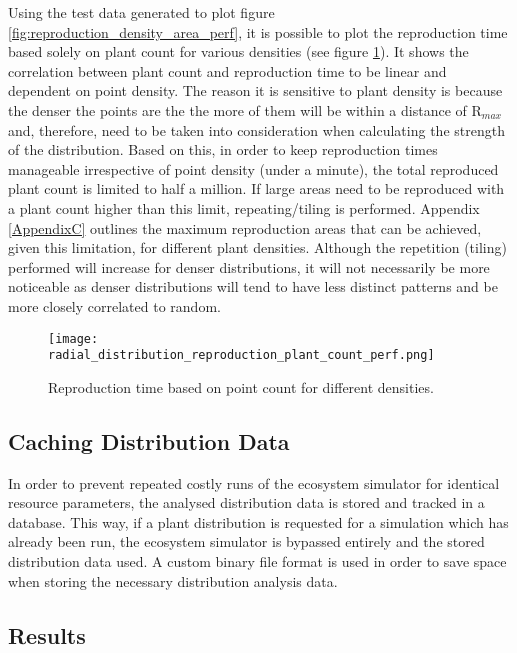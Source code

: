 Using the test data generated to plot figure \ref{fig:reproduction_density_area_perf}, it is possible to plot the reproduction time based solely on plant count for various densities (see figure \ref{fig:reproduction_plant_count_perf}). It shows the correlation between plant count and reproduction time to be linear and dependent on point density. The reason it is sensitive to plant density is because the denser the points are the the more of them will be within a distance of R$_{max}$ and, therefore, need to be taken into consideration when calculating the strength of the distribution. Based on this, in order to keep reproduction times manageable irrespective of point density (under a minute), the total reproduced plant count is limited to half a million. If large areas need to be reproduced with a plant count higher than this limit, repeating/tiling is performed. Appendix \ref{AppendixC} outlines the maximum reproduction areas that can be achieved, given this limitation, for different plant densities. Although the repetition (tiling) performed will increase for denser distributions, it will not necessarily be more noticeable as denser distributions will tend to have less distinct patterns and be more closely correlated to random.\\

\begin{figure}
\center
	\texttt{[image: radial\_distribution\_reproduction\_plant\_count\_perf.png]}
	\caption{ Reproduction time based on point count for different densities.}	
	\label{fig:reproduction_plant_count_perf}
\end{figure}

\subsection{Caching Distribution Data}

In order to prevent repeated costly runs of the ecosystem simulator for identical resource parameters, the analysed distribution data is stored and tracked in a database. This way, if a plant distribution is requested for a simulation which has already been run, the ecosystem simulator is bypassed entirely and the stored distribution data used. A custom binary file format is used in order to save space when storing the necessary distribution analysis data.

\subsection{Results}


